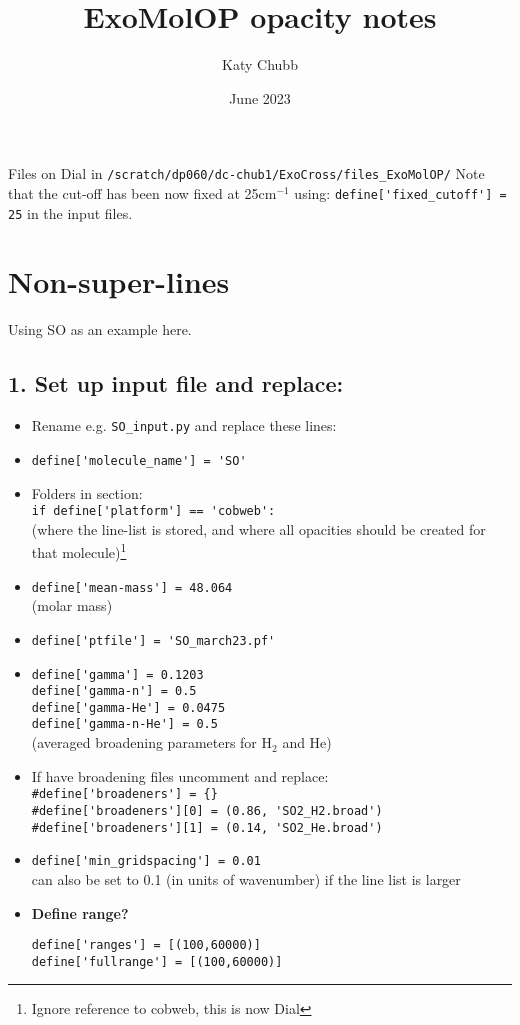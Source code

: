 \documentclass{article}
\title{ExoMolOP opacity notes}
\author{Katy Chubb}
\date{June 2023}
\begin{document}
\maketitle


Files on Dial in \verb|/scratch/dp060/dc-chub1/ExoCross/files_ExoMolOP/|
Note that the cut-off has been now fixed at 25cm$^{-1}$ using: \verb|define['fixed_cutoff'] = 25| in the input files. 
\section{Non-super-lines}

Using SO as an example here. 

\subsection*{1. Set up input file and replace:}

\begin{itemize}
\item Rename e.g. \verb|SO_input.py| and replace these lines:
\item \verb|define['molecule_name'] = 'SO'|
\item Folders in section: \\
\verb|if define['platform'] == 'cobweb':| \\
(where the line-list is stored, and where all opacities should be created for that molecule)\footnote{Ignore reference to cobweb, this is now Dial}
\item \verb|define['mean-mass'] = 48.064| \\ (molar mass)
\item \verb|define['ptfile'] = 'SO_march23.pf'|
\item \verb|define['gamma'] = 0.1203| \\
\verb|define['gamma-n'] = 0.5| \\
\verb|define['gamma-He'] = 0.0475| \\
\verb|define['gamma-n-He'] = 0.5| \\
(averaged broadening parameters for H$_2$ and He)
\item If have broadening files uncomment and replace: \\
\verb|#define['broadeners'] = {}|\\
\verb|#define['broadeners'][0] = (0.86, 'SO2_H2.broad')|\\
\verb|#define['broadeners'][1] = (0.14, 'SO2_He.broad')|
\item \verb|define['min_gridspacing'] = 0.01| \\ can also be set to 0.1 (in units of wavenumber) if the line list is larger 

\item \textbf{Define range?}

\verb|define['ranges'] = [(100,60000)]| \\
\verb|define['fullrange'] = [(100,60000)]| \\

\end{itemize}
\end{document}
